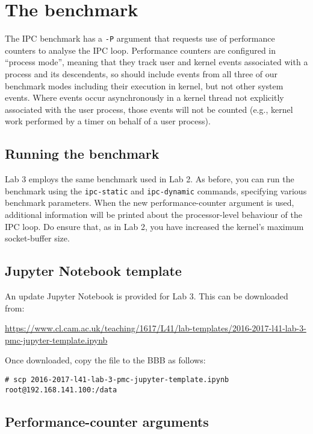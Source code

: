 \documentclass[a4paper,10pt]{article}
\begin{document}
\section*{The benchmark}

The IPC benchmark has a \texttt{-P} argument that requests use of performance
counters to analyse the IPC loop.
Performance counters are configured in ``process mode'', meaning that they
track user and kernel events associated with a process and its descendents, so
should include events from all three of our benchmark modes including their
execution in kernel, but not other system events.
Where events occur asynchronously in a kernel thread not explicitly associated
with the user process, those events will not be counted (e.g., kernel work
performed by a timer on behalf of a user process).

\subsection*{Running the benchmark}

Lab 3 employs the same benchmark used in Lab 2.
As before, you can run the benchmark using the \texttt{ipc-static} and
\texttt{ipc-dynamic} commands, specifying various benchmark parameters.
When the new performance-counter argument is used, additional information will
be printed about the processor-level behaviour of the IPC loop.
Do ensure that, as in Lab 2, you have increased the kernel's maximum
socket-buffer size.

\subsection*{Jupyter Notebook template}

An update Jupyter Notebook is provided for Lab 3. This can be downloaded from:

\smallskip
\noindent
{\small
\url{https://www.cl.cam.ac.uk/teaching/1617/L41/lab-templates/2016-2017-l41-lab-3-pmc-jupyter-template.ipynb}
}
\smallskip

Once downloaded, copy the file to the BBB as follows:

\begin{verbatim}
# scp 2016-2017-l41-lab-3-pmc-jupyter-template.ipynb root@192.168.141.100:/data
\end{verbatim}

\subsection*{Performance-counter arguments}
\end{document}
